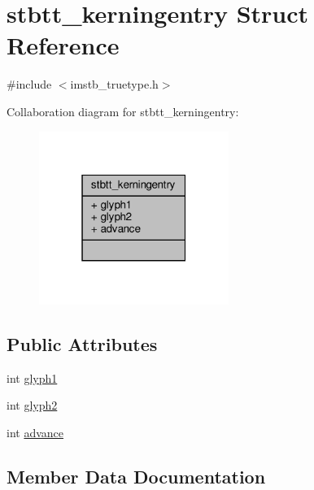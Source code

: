 \hypertarget{structstbtt__kerningentry}{}\section{stbtt\+\_\+kerningentry Struct Reference}
\label{structstbtt__kerningentry}


{\ttfamily \#include $<$imstb\+\_\+truetype.\+h$>$}



Collaboration diagram for stbtt\+\_\+kerningentry\+:
\nopagebreak
\begin{figure}[H]
\begin{center}
\leavevmode
\includegraphics[width=175pt]{structstbtt__kerningentry__coll__graph}
\end{center}
\end{figure}
\subsection*{Public Attributes}
\begin{DoxyCompactItemize}
\item 
int \hyperlink{structstbtt__kerningentry_a395848ac004ad9193c532ebc08b07f91}{glyph1}
\item 
int \hyperlink{structstbtt__kerningentry_a9d5a83a93bb6a40bed5c166c5f295c61}{glyph2}
\item 
int \hyperlink{structstbtt__kerningentry_a1924543c84b2abbdbac1a951f441d8aa}{advance}
\end{DoxyCompactItemize}


\subsection{Member Data Documentation}
\mbox{\label{structstbtt__kerningentry_a1924543c84b2abbdbac1a951f441d8aa}} 
